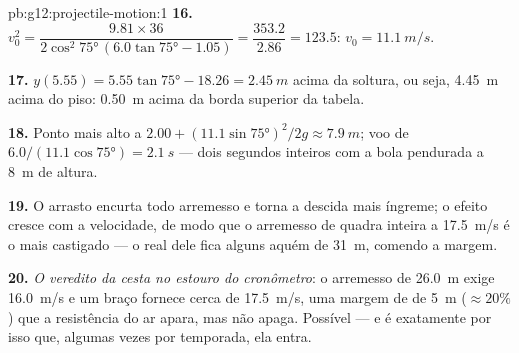 \begin{solution}{pb:g12:projectile-motion:1}
\textbf{16.} $v_0^2 = \dfrac{9.81 \times 36}{2\cos^2\ang{75}\,
(6.0\tan\ang{75} - 1.05)} = \dfrac{353.2}{2.86} = 123.5$:
$v_0 = \qty{11.1}{m/s}$.

\textbf{17.} $y(5.55) = 5.55\tan\ang{75} - 18.26 = \qty{2.45}{m}$ acima
da soltura, ou seja, \qty{4.45}{m} acima do piso: \qty{0.50}{m} acima da
borda superior da tabela.

\textbf{18.} Ponto mais alto a
$2.00 + (11.1\sin\ang{75})^2/2g \approx \qty{7.9}{m}$; voo de
$6.0/(11.1\cos\ang{75}) = \qty{2.1}{s}$ --- dois segundos inteiros com a
bola pendurada a \qty{8}{m} de altura.

\textbf{19.} O arrasto encurta todo arremesso e torna a descida mais
íngreme; o efeito cresce com a velocidade, de modo que o arremesso de
quadra inteira a \qty{17.5}{m/s} é o mais castigado --- o  real
dele fica alguns  aquém de \qty{31}{m}, comendo a margem.

\textbf{20.} \emph{O veredito da cesta no estouro do cronômetro}: o
arremesso de \qty{26.0}{m} exige \qty{16.0}{m/s} e um braço fornece cerca
de \qty{17.5}{m/s}, uma margem de  de \qty{5}{m} ($\approx 20\%$)
que a resistência do ar apara, mas não apaga. Possível --- e é
exatamente por isso que, algumas vezes por temporada, ela entra.
\end{solution}

